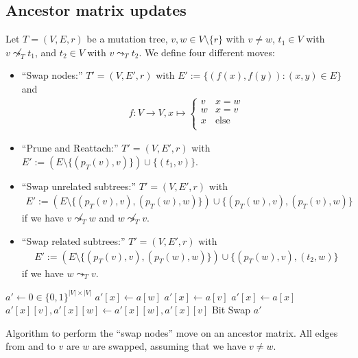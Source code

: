 \subsection{Ancestor matrix updates}

\begin{definition}
    \label{def:tree_moves}
    Let $T = (V, E, r)$ be a mutation tree, $v, w \in V \setminus \{r\}$ with $v \neq w$, $t_1 \in V$ with $v \not\leadsto_T t_1$, and $t_2 \in V$ with $v \leadsto_T t_2$. We define four different moves:
    \begin{itemize}
        \item ``Swap nodes:'' $T' = (V, E', r)$ with $E' := \{(f(x), f(y)) : (x, y) \in E\}$ and
        \begin{align*}
            f: V \rightarrow V, x \mapsto \begin{cases}
                v & x = w \\
                w & x = v \\
                x & \text{else} \\
            \end{cases}
        \end{align*}
        \item ``Prune and Reattach:'' $T' = (V, E', r)$ with $E' := (E \setminus \{(p_T(v), v)\}) \cup \{(t_1, v)\}$.
        \item ``Swap unrelated subtrees:'' $T' = (V, E', r)$ with
        \begin{align*}
            E' := (E \setminus \{(p_T(v), v), (p_T(w), w)\}) \cup \{(p_T(w), v), (p_T(v), w)\}
        \end{align*}
        if we have $v \not\leadsto_T w$ and $w \not \leadsto_T v$.
        \item ``Swap related subtrees:'' $T' = (V, E', r)$ with 
        \begin{align*}
            E' := (E \setminus \{(p_T(v), v), (p_T(w), w)\}) \cup \{(p_T(w), v), (t_2, w)\}
        \end{align*}
        if we have $w \leadsto_T v$.
    \end{itemize}
\end{definition}

\begin{algorithm}[p]
    \begin{algorithmic}[1]
            \State $a' \leftarrow 0 \in \{0,1\}^{|V| \times |V|}$
                    \State $a'[x] \leftarrow a[w]$
                    \State $a'[x] \leftarrow a[v]$
                \Else
                    \State $a'[x] \leftarrow a[x]$
                \EndIf
                \State $a'[x][v], a'[x][w] \leftarrow a'[x][w], a'[x][v]$ \Comment Bit Swap
            \EndFor
            \State \Return $a'$
        \EndFunction
    \end{algorithmic}
    \caption{Algorithm to perform the ``swap nodes'' move on an ancestor matrix. All edges from and to $v$ are $w$ are swapped, assuming that we have $v \neq w$.}
    \label{alg:am_swap_nodes}
\end{algorithm}

